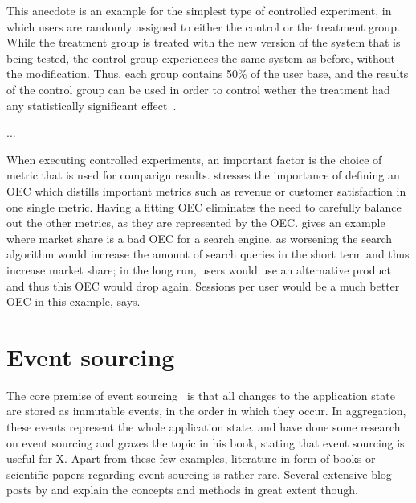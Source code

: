 This anecdote is an example for the simplest type of controlled experiment, in which users are randomly assigned to either the control or the treatment group.
While the treatment group is treated with the new version of the system that is being tested, the control group experiences the same system as before, without the modification.
Thus, each group contains 50\% of the user base, and the results of the control group can be used in order to control wether the treatment had any statistically significant effect~\cite{Kohavi2009}.

...

When executing controlled experiments, an important factor is the choice of metric that is used for comparign results.
\citet{Kohavi2013a} stresses the importance of defining an \ac{OEC} which distills important metrics such as revenue or customer satisfaction in one single metric.
Having a fitting \ac{OEC} eliminates the need to carefully balance out the other metrics, as they are represented by the \ac{OEC}.
\citeauthor{Kohavi2013a} gives an example where market share is a bad \ac{OEC} for a search engine, as worsening the search algorithm would increase the amount of search queries in the short term and thus increase market share; in the long run, users would use an alternative product and thus this \ac{OEC} would drop again.
Sessions per user would be a much better \ac{OEC} in this example, \citeauthor{Kohavi2013a} says.


\section{Event sourcing}
\label{sec:fundamentals:event}

The core premise of event sourcing~\cite{WEB:Fowler:2005} is that all changes to the application state are stored as immutable events, in the order in which they occur.
In aggregation, these events represent the whole application state.
\citet{Overeem2017} and \citet{Erb2016} have done some research on event sourcing and \citet{evans2004domain} grazes the topic in his book, stating that event sourcing is useful for X.
Apart from these few examples, literature in form of books or scientific papers regarding event sourcing is rather rare.
Several extensive blog posts by \citet{WEB:Fowler:2005} and \citet{young2010whyeventsourcing} explain the concepts and methods in great extent though.

